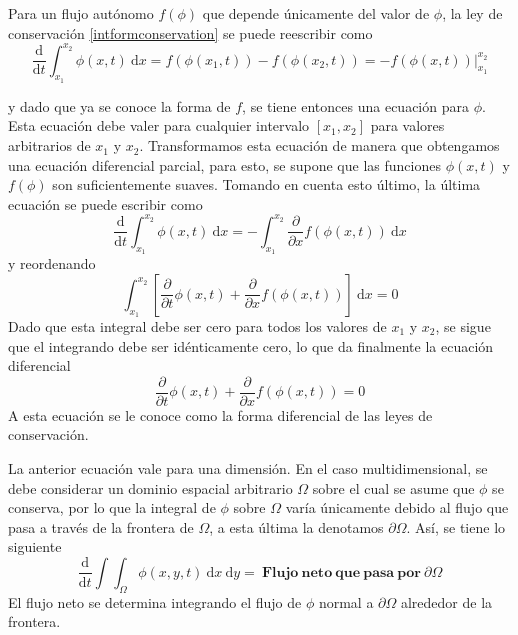 \documentclass[11pt,twoside,openright,spanish]{report}
\numberwithin{equation}{chapter}
\numberwithin{figure}{chapter}
\numberwithin{table}{chapter}
\begin{document}
Para un flujo autónomo $f(\phi)$ que depende únicamente del valor de $\phi$, la ley de conservación \ref{intformconservation} se puede reescribir como
\begin{equation}
\frac{\text{d}}{\text{d}t}\int_{x_1}^{x_2}\phi(x,t)\ \text{d}x=f(\phi(x_1,t))-f(\phi(x_2,t))=-\left.f(\phi(x,t))\right|_{x_1}^{x_2}
\end{equation} 

\noindent
y dado que ya se conoce la forma de $f$, se tiene entonces una ecuación para $\phi$. Esta ecuación debe valer para cualquier intervalo $\left[x_1,x_2\right]$ para valores arbitrarios de $x_1$ y $x_2$. Transformamos esta ecuación de manera que obtengamos una ecuación diferencial parcial, para esto, se supone que las funciones $\phi(x,t)$ y $f(\phi)$ son suficientemente suaves. Tomando en cuenta esto último, la última ecuación se puede escribir como
\begin{equation}
\frac{\text{d}}{\text{d}t}\int_{x_1}^{x_2}\phi(x,t)\ \text{d}x=-\int_{x_1}^{x_2}\frac{\partial}{\partial x}f(\phi(x,t))\ \text{d}x
\end{equation}
y reordenando
\begin{equation}
\int_{x_1}^{x_2}\left[\frac{\partial}{\partial t}\phi(x,t)+\frac{\partial}{\partial x}f(\phi(x,t))\right]\ \text{d}x=0
\end{equation}
Dado que esta integral debe ser cero para todos los valores de $x_1$ y $x_2$, se sigue que el integrando debe ser idénticamente cero, lo que da finalmente la ecuación diferencial
\begin{equation}
\frac{\partial}{\partial t}\phi(x,t)+\frac{\partial}{\partial x}f(\phi(x,t))=0
\end{equation}
A esta ecuación se le conoce como la forma diferencial de las leyes de conservación.

La anterior ecuación vale para una dimensión. En el caso multidimensional, se debe considerar un dominio espacial arbitrario $\Omega$ sobre el cual se asume que $\phi$ se conserva, por lo que la integral de $\phi$ sobre $\Omega$ varía únicamente debido al flujo que pasa a través de la frontera de $\Omega$, a esta última la denotamos $\partial\Omega$. Así, se tiene lo siguiente
\begin{equation}
\frac{\text{d}}{\text{d}t}\int\int_\Omega \phi(x,y,t)\ \text{d}x\ \text{d}y=\ \mathbf{Flujo\ neto\ que\ pasa\ por\ }\partial\Omega
\label{flujo2d}
\end{equation}
El flujo neto se determina integrando el flujo de $\phi$ normal a $\partial\Omega$ alrededor de la frontera.
\end{document}
